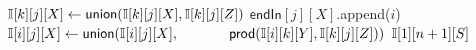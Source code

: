 \begin{algorithm}[t]
\begin{algorithmic}[1]
                   \label{gram:ln:calc} 
                           \label{gram:ln:directProdBegin}                             
                            \State $\mathbb{I}[k][j][X] \gets \mathsf{union}(\mathbb{I}[k][j][X],
                            \mathbb{I}[k][j][Z])$ \label{gram:ln:directProdEnd}
                          \EndFor
                        \If{$\tableI[k][j][Z] \neq \empt $}
                        \label{gram:ln:kind2begin}                             
                                  \label{gram:ln:innermost}
                                \If{$\tableI[i][j][X]=\empt$}
                                  \label{gram:ln:innermost3}
                                  \State $\mathsf{endIn}[j][X]$.append($i$)
                                  \label{gram:ln:endset2}
                                \EndIf
                                  \label{gram:ln:innermost2}
                                \State $\mathbb{I}[i][j][X] \gets \mathsf{union}(\mathbb{I}[i][j][X],$
                                \State $\mbox{~}\hspace{3em} \mathsf{prod}(\mathbb{I}[i][k][Y], \mathbb{I}[k][j][Z]))$
                               \EndFor
                            \EndFor
                        \label{gram:ln:kind2end}                             
                         \EndIf
                    \EndFor
                  \EndFor
                  \EndFor
                  \State\Return $\mathbb{I}[1][n+1][S]$ \label{gram:ln:last}
\end{algorithmic}%
\end{algorithm}%
